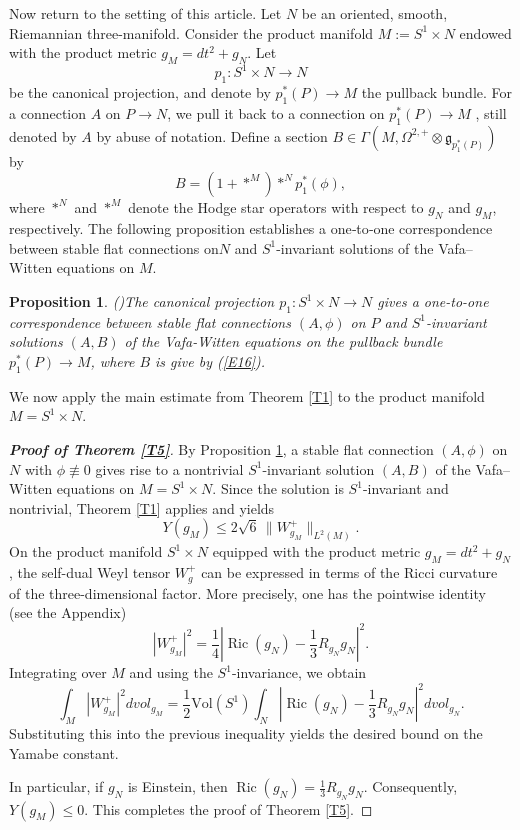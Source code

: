 \documentclass[12pt, twoside]{article}
\newtheorem{proposition}[theorem]{Proposition}
\theoremstyle{definition}
\numberwithin{equation}{section}
\def\Om{\Omega}
\def\Ga{\Gamma}
\begin{document}
Now return to the setting of this article. Let $N$ be an oriented, smooth, Riemannian three-manifold. Consider the product manifold  $M:=S^{1}\times N$ endowed with the product metric $g_{M}=dt^{2}+g_{N}$. Let
$$p_{1}:S^{1}\times N\rightarrow N$$
be the canonical projection, and denote by $p_{1}^{\ast}(P)\rightarrow M$ the pullback bundle. For a connection $A$ on $P\rightarrow N$, we pull it back to a connection on $p_{1}^{\ast}(P)\rightarrow M$ , still denoted by $A$ by abuse of notation. Define a section $B\in\Ga(M,\Om^{2,+}\otimes\mathfrak{g}_{p^{\ast}_{1}(P)})$ by
\begin{equation}\label{E16}
B=(1+\ast^{M})\ast^{N}p_{1}^{\ast}(\phi),
\end{equation}
where $\ast^{N}$ and $\ast^{M}$ denote the Hodge star operators with respect to $g_{N}$ and $g_{M}$, respectively. The following proposition establishes a one‑to‑one correspondence between stable flat connections on$N$ and $S^{1}$-invariant solutions of the Vafa–Witten equations on $M$.
\begin{proposition}(\cite[Proposition 2.3]{Hua22})\label{P6}
	The canonical projection $p_{1}:S^{1}\times N\rightarrow N$ gives a one-to-one correspondence between stable flat  connections $(A,\phi)$ on $P$ and $S^{1}$-invariant solutions $(A,B)$ of the Vafa-Witten equations on the pullback bundle $p^{\ast}_{1}(P)\rightarrow M$, where $B$ is give by (\ref{E16}).
\end{proposition}

We now apply the main estimate from Theorem \ref{T1} to the product manifold $M=S^{1}\times N$.
\begin{proof}[\textbf{Proof of Theorem \ref{T5}}]
	By Proposition \ref{P6}, a stable flat connection \((A, \phi)\) on \(N\) with \(\phi\not\equiv0\) gives rise to a nontrivial \(S^1\)-invariant solution \((A, B)\) of the Vafa--Witten equations on \(M = S^1 \times N\).  Since the solution is \(S^1\)-invariant and nontrivial, Theorem \ref{T1} applies and yields
	\[
	Y(g_{M}) \leq 2\sqrt{6} \, \| W_{g_{M}}^{+} \|_{L^2(M)}.
	\]
	On the product manifold \(S^1 \times N\) equipped with the product metric $g_{M}=dt^{2}+g_{N}$, 
	the self-dual Weyl tensor \(W_g^+\) can be expressed in terms of the Ricci curvature of the three-dimensional factor. 
	More precisely, one has the pointwise identity (see the Appendix)
	\[
	|W_{g_{M}}^{+}|^{2}= \frac{1}{4}\left| \operatorname{Ric}(g_N) - \frac{1}{3} R_{g_N} g_N \right|^{2}.
	\]
	Integrating over \(M\) and using the \(S^1\)-invariance, we obtain
	\[
	\int_{M} | W_{g_{M}}^{+}|^{2}dvol_{g_{M}}=\frac{1}{2}\mathrm{Vol}(S^{1})\int_{N}\left|\operatorname{Ric}(g_N) - \frac{1}{3} R_{g_N} g_N \right|^{2}dvol_{g_{N}}.
	\]
	Substituting this into the previous inequality yields the desired bound on the Yamabe constant. 
	
	In particular, if $g_{N}$ is Einstein, then $\operatorname{Ric}(g_N) =\frac{1}{3}R_{g_N} g_N $. Consequently, $Y(g_{M})\leq 0$.
	 This completes the proof of Theorem \ref{T5}. 
\end{proof}
\end{document}
